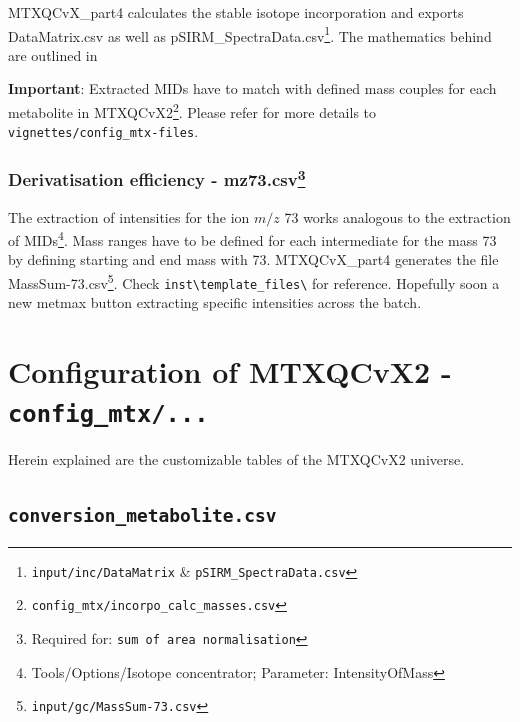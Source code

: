 \documentclass[]{book}
\let\rmarkdownfootnote\footnote%
\def\footnote{\protect\rmarkdownfootnote}
\theoremstyle{definition}
\theoremstyle{definition}
\theoremstyle{definition}
\theoremstyle{remark}
\begin{document}
MTXQCvX\_part4 calculates the stable isotope incorporation and exports
DataMatrix.csv as well as pSIRM\_SpectraData.csv\footnote{\texttt{input/inc/DataMatrix}
  \& \texttt{pSIRM\_SpectraData.csv}}. The mathematics behind are
outlined in \citep{Pietzke2014}

\textbf{Important}: Extracted MIDs have to match with defined mass
couples for each metabolite in MTXQCvX2\footnote{\texttt{config\_mtx/incorpo\_calc\_masses.csv}}.
Please refer for more details to \texttt{vignettes/config\_mtx-files}.

\subsection[Derivatisation efficiency -
mz73.csv]{\texorpdfstring{Derivatisation efficiency - mz73.csv\footnote{Required
  for: \texttt{sum\ of\ area\ normalisation}}}{Derivatisation efficiency - mz73.csv}}\label{derivatisation-efficiency---mz73.csv}

The extraction of intensities for the ion \(m/z\) 73 works analogous to
the extraction of MIDs\footnote{Tools/Options/Isotope concentrator;
  Parameter: IntensityOfMass}. Mass ranges have to be defined for each
intermediate for the mass 73 by defining starting and end mass with 73.
MTXQCvX\_part4 generates the file MassSum-73.csv\footnote{\texttt{input/gc/MassSum-73.csv}}.
Check \texttt{inst\textbackslash{}template\_files\textbackslash{}} for
reference. Hopefully soon a new metmax button extracting specific
intensities across the batch.

\chapter{\texorpdfstring{Configuration of MTXQCvX2 -
\texttt{config\_mtx/...}}{Configuration of MTXQCvX2 - config\_mtx/...}}\label{configuration-of-mtxqcvx2---config_mtx...}

Herein explained are the customizable tables of the MTXQCvX2 universe.

\section{\texorpdfstring{\texttt{conversion\_metabolite.csv}}{conversion\_metabolite.csv}}\label{conversion_metabolite.csv}
\end{document}
